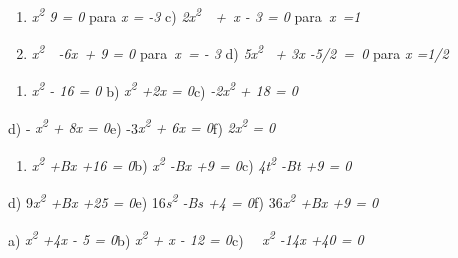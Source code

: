 \begin{exercicios}


\begin{enumerate}[label=\alph*)]
	\item \textit{x\textsuperscript{2} 9 = 0} para \textit{x = -3} c) \textit{2x\textsuperscript{2}~~+~x - 3 = 0   }para\textit{~x~=1   }

	\item \textit{x\textsuperscript{2}~~-6x~+ 9 = 0   }para\textit{~x~= - 3   }\quad d) \textit{5x\textsuperscript{2}~ + 3x -5/2~=~0   }para\textit{ x =1/2~~ }
\end{enumerate}

\begin{enumerate}[label=\alph*)]
	\item \textit{x\textsuperscript{2} - 16 = 0\quad } \quad b) \textit{x\textsuperscript{2} +2x = 0\quad \quad }c)\textit{ -2x\textsuperscript{2} + 18 = 0}
\end{enumerate}

d) - \textit{x\textsuperscript{2} + 8x = 0\quad }\quad e) -3\textit{x\textsuperscript{2} + 6x = 0\quad }f) \textit{2x\textsuperscript{2} = 0\quad }


\begin{enumerate}[label=\alph*)]
	\item \textit{x\textsuperscript{2} +Bx +16 = 0\quad }b) \textit{x\textsuperscript{2} -Bx +9 = 0}\quad c) \textit{4t\textsuperscript{2} -Bt +9 = 0\quad \quad }
\end{enumerate}

d) 9\textit{x\textsuperscript{2} +Bx +25 = 0\quad }e) 16\textit{s\textsuperscript{2} -Bs +4 = 0}\quad f) 36\textit{x\textsuperscript{2} +Bx +9 = 0}


a) \textit{x\textsuperscript{2} +4x - 5 = 0\quad }b) \textit{x\textsuperscript{2} + x - 12 = 0\quad \quad }c)~~ \textit{x\textsuperscript{2} -14x +40 = 0}


\end{exercicios}
